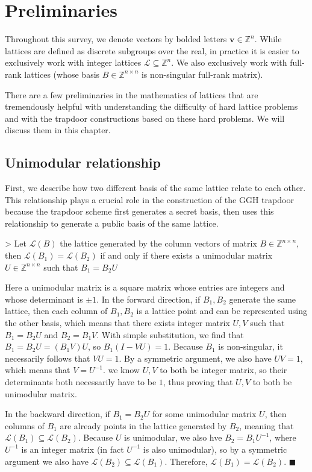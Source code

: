 \section{Preliminaries}
Throughout this survey, we denote vectors by bolded letters $\mathbf{v} \in \mathbb{Z}^n$. While lattices are defined as discrete subgroups over the real, in practice it is easier to exclusively work with integer lattices $\mathcal{L} \subseteq \mathbb{Z}^n$. We also exclusively work with full-rank lattices (whose basis $B \in \mathbb{Z}^{n \times n}$ is non-singular full-rank matrix).

There are a few preliminaries in the mathematics of lattices that are tremendously helpful with understanding the difficulty of hard lattice problems and with the trapdoor constructions based on these hard problems. We will discuss them in this chapter.

\subsection{Unimodular relationship}
First, we describe how two different basis of the same lattice relate to each other. This relationship plays a crucial role in the construction of the GGH trapdoor because the trapdoor scheme first generates a secret basis, then uses this relationship to generate a public basis of the same lattice.

> Let $\mathcal{L}(B)$ the lattice generated by the column vectors of matrix $B \in \mathbb{Z}^{n \times n}$, then $\mathcal{L}(B_1) = \mathcal{L}(B_2)$ if and only if there exists a unimodular matrix $U \in \mathbb{Z}^{n \times n}$ such that $B_1 = B_2U$

Here a unimodular matrix is a square matrix whose entries are integers and whose determinant is $\pm 1$. In the forward direction, if $B_1, B_2$ generate the same lattice, then each column of $B_1, B_2$ is a lattice point and can be represented using the other basis, which means that there exists integer matrix $U, V$ such that $B_1 = B_2U$ and $B_2 = B_1V$. With simple substitution, we find that $B_1 = B_2U = (B_1V)U$, so $B_1(I - VU) = 1$. Because $B_1$ is non-singular, it necessarily follows that $VU = 1$. By a symmetric argument, we also have $UV = 1$, which means that $V = U^{-1}$. we know $U, V$ to both be integer matrix, so their determinants both necessarily have to be $1$, thus proving that $U, V$ to both be unimodular matrix.

In the backward direction, if $B_1 = B_2U$ for some unimodular matrix $U$, then columns of $B_1$ are already points in the lattice generated by $B_2$, meaning that $\mathcal{L}(B_1) \subseteq \mathcal{L}(B_2)$. Because $U$ is unimodular, we also hve $B_2 = B_1U^{-1}$, where $U^{-1}$ is an integer matrix (in fact $U^{-1}$ is also unimodular), so by a symmetric argument we also have $\mathcal{L}(B_2) \subseteq \mathcal{L}(B_1)$. Therefore, $\mathcal{L}(B_1) = \mathcal{L}(B_2)$. $\blacksquare$

